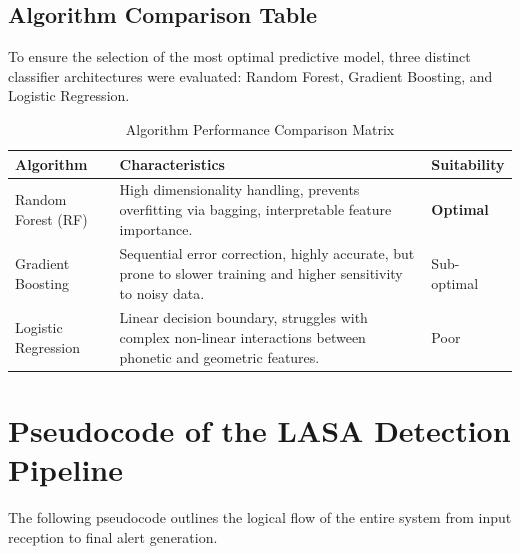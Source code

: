 \documentclass[12pt,a4paper]{report}
\begin{document}
\subsection{Algorithm Comparison Table}
To ensure the selection of the most optimal predictive model, three distinct classifier architectures were evaluated: Random Forest, Gradient Boosting, and Logistic Regression.

\begin{table}[H]
\centering
\caption{Algorithm Performance Comparison Matrix}
\label{tab:algo_comp}
\renewcommand{\arraystretch}{1.3}
\begin{tabular}{@{}p{3.5cm}p{8cm}p{3cm}@{}}
\toprule
\textbf{Algorithm} & \textbf{Characteristics} & \textbf{Suitability} \\
\midrule
Random Forest (RF) & High dimensionality handling, prevents overfitting via bagging, interpretable feature importance. & \textbf{Optimal} \\
Gradient Boosting & Sequential error correction, highly accurate, but prone to slower training and higher sensitivity to noisy data. & Sub-optimal \\
Logistic Regression & Linear decision boundary, struggles with complex non-linear interactions between phonetic and geometric features. & Poor \\
\bottomrule
\end{tabular}
\end{table}

\section{Pseudocode of the LASA Detection Pipeline}

The following pseudocode outlines the logical flow of the entire system from input reception to final alert generation.
\end{document}
